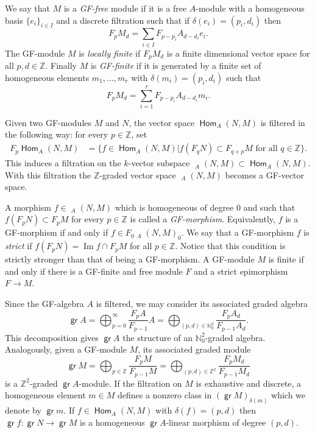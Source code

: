 \documentclass[11pt,fleqn]{article}
\theoremstyle{plain}
\theoremstyle{remark}
\theoremstyle{definition}
\newcommand\NN{\mathbb N}
\newcommand\ZZ{\mathbb Z}
\renewcommand\to{\longrightarrow}
\DeclareMathOperator\im{Im}
\DeclareMathOperator\Hom{\mathsf{Hom}}
\DeclareMathOperator\GrHom{\underline{\mathsf{Hom}}}
\DeclareMathOperator\gr{\mathsf{gr}}
\begin{document}
We say that $M$ is a \emph{GF-free} module if it is a free $A$-module with a homogeneous 
basis $\{e_i\}_{i \in I}$ and a discrete filtration such that if $\delta(e_i) = (p_i,d_i)$
then
$$ F_p M_d = \sum_{i \in I} F_{p-p_i}A_{d-d_i} e_i.$$ 
The GF-module $M$ is \emph{locally finite} if $F_pM_d$ is a finite dimensional vector space
for all $p,d \in \ZZ$. Finally $M$ is \emph{GF-finite} if it is generated by a
finite set of homogeneous elements $m_1, \ldots, m_r$ with $\delta(m_i) = (p_i,d_i)$
such that  
$$ F_p M_d = \sum_{i = 1}^r F_{p-p_i}A_{d-d_i} m_i.$$ 

Given two GF-modules $M$ and $N$, the vector space $\Hom_A(N,M)$ is filtered in the following
way: for every $p \in \ZZ$, set
\begin{align*}
F_p\Hom_A(N,M) &= \{f \in \Hom_A(N,M)| f(F_qN) \subset F_{q+p} M \mbox{ for all }
q \in \ZZ\}.
\end{align*}
This induces a filtration on the $k$-vector subspace $\GrHom_A(N,M) \subset \Hom_A(N,M)$.
With this filtration the $\ZZ$-graded vector space $\GrHom_A(N,M)$ becomes a GF-vector
space. 

A morphism $f \in \GrHom_A(N,M)$ which is homogeneous of degree $0$ and such that $f(F_pN) 
\subset F_pM$ for every $p \in \ZZ$ is called a \emph{GF-morphism}.
Equivalently, $f$ is a GF-morphism if and only if $f \in F_0\GrHom_A(N,M)_0$. We say that
a GF-morphism $f$ is \emph{strict} if $f(F_p N) = \im f \cap F_p M$ for all $p \in \ZZ$.
Notice that this condition is strictly stronger than that of being a GF-morphism. A
GF-module $M$ is finite if and only if there is a GF-finite and free module $F$ and a
strict epimorphism $F \to M$.

Since the GF-algebra $A$ is filtered, we may consider its associated graded algebra 
	$$\gr A = \bigoplus_{p = 0}^{\infty} \frac{F_{p}A}{F_{p-1}} A = \bigoplus_{(p,d) \in
	\NN_0^2} \frac{F_pA_d}{F_{p-1}A_d}.$$
This decomposition gives $\gr A$ the structure of an $\NN_0^2$-graded algebra.
Analogously, given a GF-module $M$, its associated graded module
	$$\gr M = \bigoplus_{p \in \ZZ} \frac{F_pM}{F_{p-1}M} = \bigoplus_{(p,d) \in \ZZ^2}
	\frac{F_pM_d}{F_{p-1}M_d}$$ 
is a $\ZZ^2$-graded $\gr A$-module. If the filtration on
$M$ is exhaustive and discrete, a homogeneous element $m \in M$ defines a nonzero class
in $(\gr M)_{\delta(m)}$ which we denote by $\gr m$. If $f \in \Hom_A(N,M)$ with $\delta(f)
= (p,d)$ then $\gr f: \gr N \to \gr M$ is a homogeneous $\gr A$-linear morphism of degree
$(p,d)$. 
\end{document}

